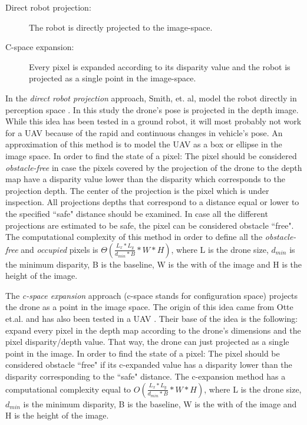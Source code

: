
\begin{description}
	\item[Direct robot projection: ] The robot is directly projected to the image-space.
	\item[C-space expansion: ] Every pixel is expanded according to its disparity value and the robot is projected as a single point in the image-space.
\end{description}

In the \textit{direct robot projection} approach, Smith, et. al, model the robot directly in perception space \cite{Smith2017a}. In this study the drone's pose is projected in the depth image. While this idea has been tested in a ground robot, it will most probably not work for a UAV because of the rapid and continuous changes in vehicle's pose. An approximation of this method is to model the \ac{UAV} as a box or ellipse in the image space. In order to find the state of a pixel: The pixel should be considered \textit{obstacle-free} in case the pixels covered by the projection of the drone to the depth map have a disparity value lower than the disparity which corresponds to the projection depth. The center of the projection is the pixel which is under inspection. All projections depths that correspond to a distance equal or lower to the specified ``safe" distance should be examined. In case all the different projections are estimated to be safe, the pixel can be considered obstacle ``free". The computational complexity of this method in order to define all the \textit{obstacle-free} and \textit{occupied }pixels is $\Theta(\frac{L_x * L_y}{d_{min} * B}  * W * H)$, where L is the drone size, $d_{min}$ is the minimum disparity, B is the baseline, W is the with of the image and H is the height of the image.


The \textit{c-space expansion} approach (c-space stands for configuration space) projects the drone as a point in the image space. The origin of this idea came from Otte et.al.\cite{Otte2009} and has also been tested in a UAV \cite{Matthies2014}. Their base of the idea is the following: expand every pixel in the depth map according to the drone's dimensions and the pixel disparity/depth value. That way, the drone can just projected as a single point in the image. In order to find the state of a pixel: The pixel should be considered obstacle ``free" if its c-expanded value has a disparity lower than the disparity corresponding to the ``safe" distance. The c-expansion method has a computational complexity equal to $O(\frac{L_x * L_y}{d_{min} * B}  * W * H)$, where L is the drone size, $d_{min}$ is the minimum disparity, B is the baseline, W is the with of the image and H is the height of the image.


